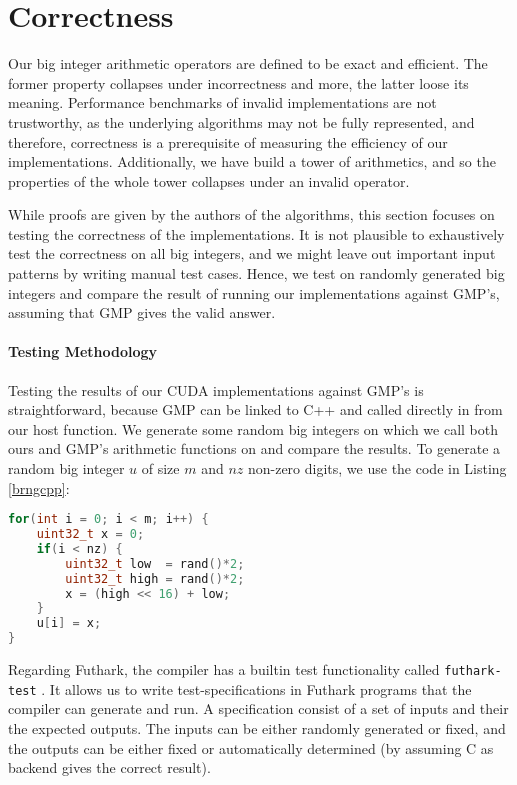\section{Correctness}
\label{sec:cor}

Our big integer arithmetic operators are defined to be exact and efficient. The
former property collapses under incorrectness and more, the latter loose its
meaning. Performance benchmarks of invalid implementations are not trustworthy,
as the underlying algorithms may not be fully represented, and therefore,
correctness is a prerequisite of measuring the efficiency of our
implementations. Additionally, we have build a tower of arithmetics, and so the
properties of the whole tower collapses under an invalid operator.

While proofs are given by the authors of the algorithms, this section focuses on
testing the correctness of the implementations. It is not plausible to
exhaustively test the correctness on all big integers, and we might leave out
important input patterns by writing manual test cases. Hence, we test on
randomly generated big integers and compare the result of running our
implementations against GMP's, assuming that GMP gives the valid answer.

\paragraph{Testing Methodology}
Testing the results of our CUDA implementations against GMP's is
straightforward, because GMP can be linked to C++ and called directly in from
our host function. We generate some random big integers on which we call both
ours and GMP's arithmetic functions on and compare the results. To generate a
random big integer $u$ of size $m$ and $\mathit{nz}$ non-zero digits, we use the
code in Listing \ref{brngcpp}:
\begin{lstlisting}[language=CPP, caption={\footnotesize Random big integer generator in C++ with $u$ of size $m$ and $nz$ non-zero digits.}, label={brngcpp}]
for(int i = 0; i < m; i++) {
    uint32_t x = 0;
    if(i < nz) {
        uint32_t low  = rand()*2;
        uint32_t high = rand()*2;
        x = (high << 16) + low;
    }
    u[i] = x;
}
\end{lstlisting}

Regarding Futhark, the compiler has a builtin test functionality called
\texttt{futhark-test} \cite{futguide}. It allows us to write test-specifications
in Futhark programs that the compiler can generate and run. A specification
consist of a set of inputs and their the expected outputs. The inputs can be
either randomly generated or fixed, and the outputs can be either fixed or
automatically determined (by assuming C as backend gives the correct result).

